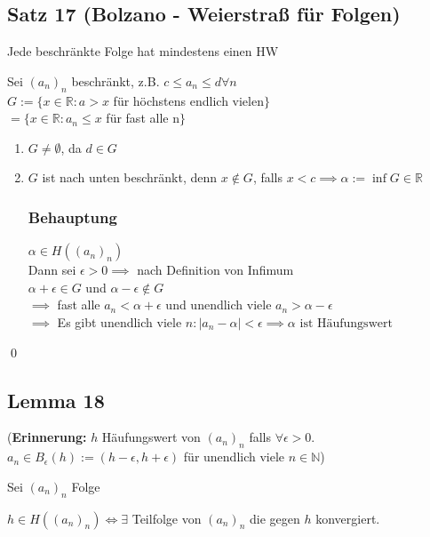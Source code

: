 \documentclass[fleqn]{scrbook}
\renewenvironment{proof}{{\bfseries Beweis }}{\qed}
\begin{document}
\subsection{Satz 17 (Bolzano - Weierstraß für Folgen)} Jede beschränkte Folge hat mindestens einen HW

\begin{proof}
Sei $(a_n)_n$ beschränkt, z.B. $c \leq a_n \leq d \forall n$\\
$G := \{ x\in\mathbb{R}: a > x$ für höchstens endlich vielen$\}$\\
$=\{x\in\mathbb{R}: a_n \leq x$ für fast alle n$\}$
\begin{enumerate}
\item $G \neq \emptyset$, da $d \in G$
\item $G$ ist nach unten beschränkt, denn $x \notin G$, falls $x < c \implies \alpha := \inf G \in \mathbb{R}$

\subsubsection{Behauptung} $\alpha \in H((a_n)_n)$\\
Dann sei $\epsilon > 0 \implies$ nach Definition von Infimum \\
$\alpha + \epsilon \in G$ und $\alpha - \epsilon \notin G$ \\
$\implies$ fast alle $a_n < \alpha + \epsilon$ und unendlich viele $a_n > \alpha - \epsilon$\\
$\implies$ Es gibt unendlich viele $n: |a_n - \alpha| < \epsilon \implies \alpha \text{ ist Häufungswert}$
\end{enumerate}
\end{proof}

\subsection{Lemma 18} 
(\textbf{Erinnerung:} $h$ Häufungswert von $(a_n)_n$ falls $\forall \epsilon > 0 $. $a_n \in B_\epsilon (h):= (h-\epsilon, h+\epsilon)$ für unendlich viele $n \in \mathbb{N}$)

Sei $(a_n)_n $ Folge

$h \in H((a_n)_n) \Longleftrightarrow \exists$ Teilfolge von $(a_n)_n$ die gegen $h$ konvergiert.
\end{document}

